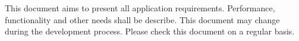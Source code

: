 This document aims to present all application requirements. Performance, functionality and other needs shall be describe. This document may change during the development process. Please check this document on a regular basis.